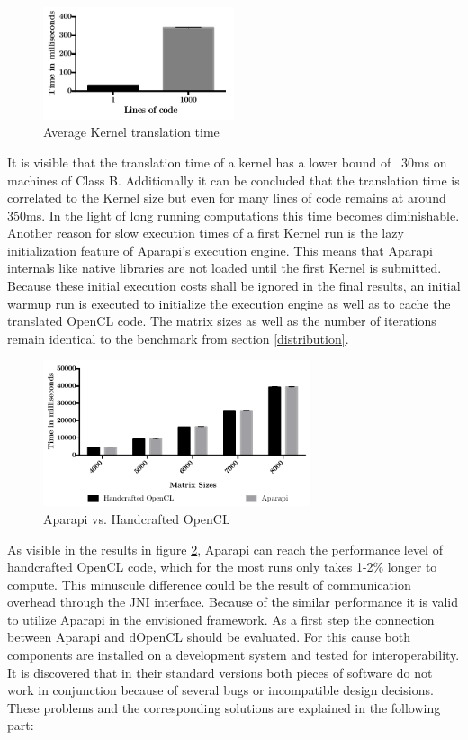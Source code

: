 \begin{figure}[H]
	\includegraphics[width=0.5\textwidth]{images/aparapi_translation.pdf}
	\centering
	\caption{Average Kernel translation time}
	\label{img:aparapi_translation}
\end{figure}

It is visible that the translation time of a kernel has a lower bound of ~30ms on machines of Class B. Additionally it can be concluded that the translation time is correlated to the Kernel size but even for many lines of code remains at around 350ms. In the light of long running computations this time becomes diminishable. Another reason for slow execution times of a first Kernel run is the lazy initialization feature of Aparapi's execution engine. This means that Aparapi internals like native libraries are not loaded until the first Kernel is submitted. Because these initial execution costs shall be ignored in the final results, an initial warmup run is executed to initialize the execution engine as well as to cache the translated OpenCL code. The matrix sizes as well as the number of iterations remain identical to the benchmark from section \ref{distribution}.

\begin{figure}[H]
	\includegraphics[width=0.7\textwidth]{images/aparapivsopencl.pdf}
	\centering
	\caption{Aparapi vs. Handcrafted OpenCL}
	\label{img:aparapi_vs_opencl}
\end{figure}

As visible in the results in figure \ref{img:aparapi_vs_opencl}, Aparapi can reach the performance level of handcrafted OpenCL code, which for the most runs only takes 1-2\% longer to compute. This minuscule difference could be the result of communication overhead through the JNI interface. Because of the similar performance it is valid to utilize Aparapi in the envisioned framework. As a first step the connection between Aparapi and dOpenCL should be evaluated. For this cause both components are installed on a development system and tested for interoperability. It is discovered that in their standard versions both pieces of software do not work in conjunction because of several bugs or incompatible design decisions. These problems and the corresponding solutions are explained in the following part:

